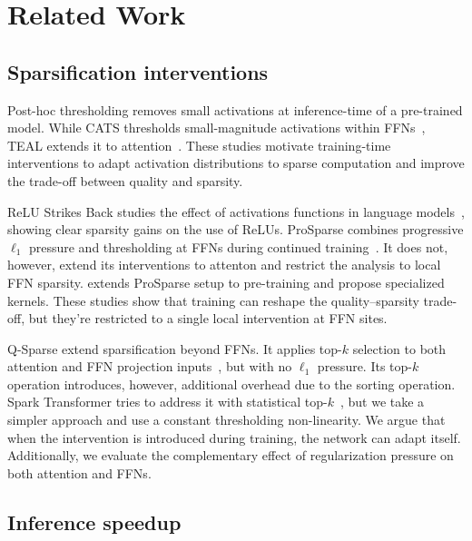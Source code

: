 \section{Related Work}
\label{sec:related-work}

\subsection{Sparsification interventions}
\label{sec:related-interventions}

Post-hoc thresholding removes small activations at inference-time of a pre-trained model. While CATS thresholds small-magnitude activations within FFNs~\citep{lee2024cats}, TEAL extends it to attention~\citep{liu2024teal}. These studies motivate training-time interventions to adapt activation distributions to sparse computation and improve the trade-off between quality and sparsity.

ReLU Strikes Back studies the effect of activations functions in language models~\citep{mirzadeh2023relu}, showing clear sparsity gains on the use of ReLUs. ProSparse combines progressive $\ell_1$ pressure and thresholding at FFNs during continued training~\citep{song2024prosparse}. It does not, however, extend its interventions to attenton and restrict the analysis to local FFN sparsity. \citet{cetin2026sparser} extends ProSparse setup to pre-training and propose specialized kernels. These studies show that training can reshape the quality--sparsity trade-off, but they're restricted to a single local intervention at FFN sites.

Q-Sparse extend sparsification beyond FFNs. It applies top-$k$ selection to both attention and FFN projection inputs~\citep{wang2024qsparse}, but with no $\ell_1$ pressure. Its top-$k$ operation introduces, however, additional overhead due to the sorting operation. Spark Transformer tries to address it with statistical top-$k$~\citep{you2025spark}, but we take a simpler approach and use a constant thresholding non-linearity. We argue that when the intervention is introduced during training, the network can adapt itself. Additionally, we evaluate the complementary effect of regularization pressure on both attention and FFNs.

\subsection{Inference speedup}
\label{sec:related-speedup}

